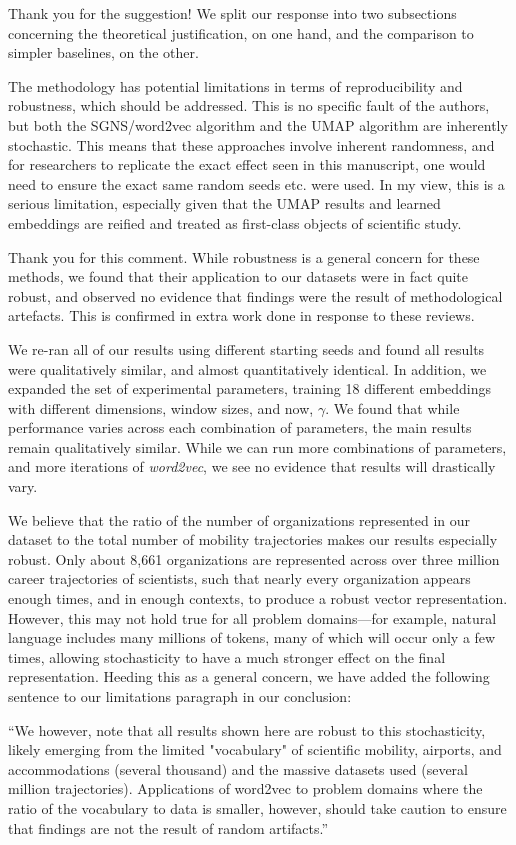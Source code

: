 \documentclass[12pt,a4paper]{article}
\newcommand{\response}[1]{{\noindent #1}}
\newcommand{\rcomment}[1]{%
\vspace{10pt}
\begin{tcolorbox}[colback=black!3,colframe=white!45!black, left=0pt, right=0pt, top=0pt, bottom=0pt, arc=0pt,outer arc=0pt, grow to left by=-0.5cm,grow to right by=-0.5cm]
#1
\end{tcolorbox}
}
\begin{document}
\response{Thank you for the suggestion! 
We split our response into two subsections concerning the theoretical justification, on one hand, and the comparison to simpler baselines, on the other. 
}



\rcomment{%
The methodology has potential limitations in terms of reproducibility and robustness, which should be addressed. This is no specific fault of the authors, but both the SGNS/word2vec algorithm and the UMAP algorithm are inherently stochastic. This means that these approaches involve inherent randomness, and for researchers to replicate the exact effect seen in this manuscript, one would need to ensure the exact same random seeds etc. were used. In my view, this is a serious limitation, especially given that the UMAP results and learned embeddings are reified and treated as first-class objects of scientific study. 
}

\response{Thank you for this comment. While robustness is a general concern for these methods, we found that their application to our datasets were in fact quite robust, and observed no evidence that findings were the result of methodological artefacts. This is confirmed in extra work done in response to these reviews. 

\noindent We re-ran all of our results using different starting seeds and found all results were qualitatively similar, and almost quantitatively identical. 
In addition, we expanded the set of experimental parameters, training 18 different embeddings with different dimensions, window sizes, and now, $\gamma$. 
We found that while performance varies across each combination of parameters, the main results remain qualitatively similar. 
While we can run more combinations of parameters, and more iterations of \textit{word2vec}, we see no evidence that results will drastically vary. 

\noindent We believe that the ratio of the number of organizations represented in our dataset to the total number of mobility trajectories makes our results especially robust. 
Only about 8,661 organizations are represented across over three million career trajectories of scientists, such that nearly every organization appears enough times, and in enough contexts, to produce a robust vector representation. 
However, this may not hold true for all problem domains—for example, natural language includes many millions of tokens, many of which will occur only a few times, allowing stochasticity to have a much stronger effect on the final representation. 
Heeding this as a general concern, we have added the following sentence to our limitations paragraph in our conclusion: 

\noindent “We however, note that all results shown here are robust to this stochasticity, likely emerging from the limited "vocabulary" of scientific mobility, airports, and accommodations (several thousand) and the massive datasets used (several million trajectories). Applications of word2vec to problem domains where the ratio of the vocabulary to data is smaller, however, should take caution to ensure that findings are not the result of random artifacts.”

}
\end{document}
